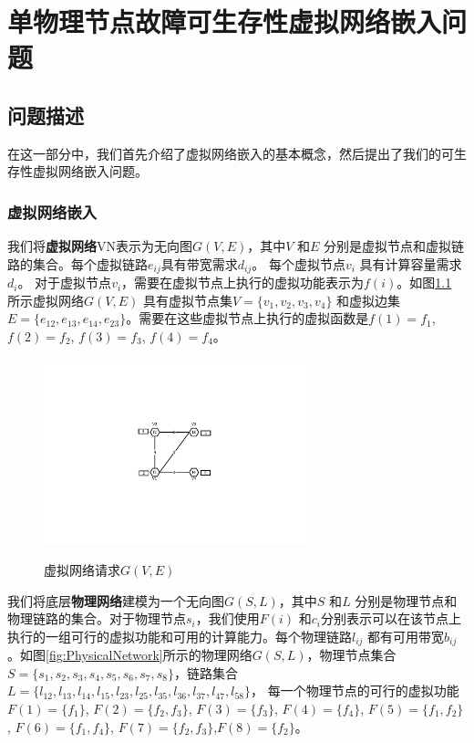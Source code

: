 \chapter{单物理节点故障可生存性虚拟网络嵌入问题}
\section{问题描述}
在这一部分中，我们首先介绍了虚拟网络嵌入的基本概念，然后提出了我们的可生存性虚拟网络嵌入问题。
\subsection{虚拟网络嵌入}
我们将\textbf{虚拟网络}VN表示为无向图$G (V,E)$，其中$V$ 和$E$ 分别是虚拟节点和虚拟链路的集合。每个虚拟链路$e_{ij}$具有带宽需求$d_{ij}$。 每个虚拟节点$v_i$ 具有计算容量需求$d_i$。 对于虚拟节点$v_i$，需要在虚拟节点上执行的虚拟功能表示为$f(i)$。如图\ref{fig:VirtualNetworkRequest} 所示虚拟网络$G (V,E)$ 具有虚拟节点集$V=\{v_1,v_2,v_3,v_4\}$ 和虚拟边集$E= \{e_{12},e_{13},e_{14},e_{23}\}$。需要在这些虚拟节点上执行的虚拟函数是$f(1)=f_1$, $f(2)=f_2$, $f(3)=f_3$, $f(4)=f_4$。

\begin{figure}[htbp]
\centering
\includegraphics[width=3.0in]{figures/VirtualNetworkRequest}\\
\caption{虚拟网络请求$G(V,E)$
}\label{fig:VirtualNetworkRequest}
\end{figure}

我们将底层\textbf{物理网络}建模为一个无向图$G (S,L)$，其中$S$ 和$L$ 分别是物理节点和物理链路的集合。对于物理节点$s_i$，我们使用$F(i)$ 和$c_i$分别表示可以在该节点上执行的一组可行的虚拟功能和可用的计算能力。每个物理链路$l_{ij}$ 都有可用带宽$b_{ij}$。如图\ref{fig:PhysicalNetwork}所示的物理网络$G (S,L)$，物理节点集合$S=\{s_1,s_2,s_3,s_4,s_5,s_6,s_7,s_8\}$，链路集合$L=\{l_{12},l_{13},l_{14},l_{15},l_{23},l_{25},l_{35},l_{36},l_{37},l_{47},l_{58}\}$，
每一个物理节点的可行的虚拟功能$F(1)=\{f_1\}$, $F(2)=\{f_2,f_3\}$, $F(3)=\{f_3\}$, $F(4)=\{f_4\}$, $F(5)=\{f_1,f_2\}$, $F(6)=\{f_1,f_4\}$, $F(7)=\{f_2,f_3\}$,$F(8)=\{f_2\}$。

